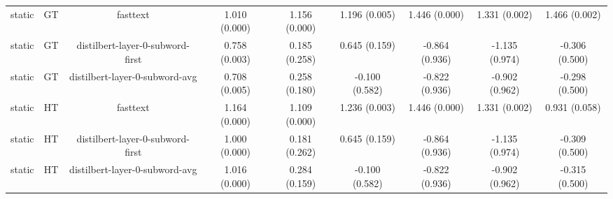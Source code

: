 \begin{sidewaystable}[htb]
\begin{tabular}{@{}ccccccccc@{}}
        static & GT & fasttext & 1.010 (0.000) & 1.156 (0.000) & 1.196 (0.005) & 1.446 (0.000) & 1.331 (0.002) & 1.466 (0.002) \\
        static & GT & distilbert-layer-0-subword-first & 0.758 (0.003) & 0.185 (0.258) & 0.645 (0.159) & -0.864 (0.936) & -1.135 (0.974) & -0.306 (0.500) \\
        static & GT & distilbert-layer-0-subword-avg & 0.708 (0.005) & 0.258 (0.180) & -0.100 (0.582) & -0.822 (0.936) & -0.902 (0.962) & -0.298 (0.500) \\
        static & HT & fasttext & 1.164 (0.000) & 1.109 (0.000) & 1.236 (0.003) & 1.446 (0.000) & 1.331 (0.002) & 0.931 (0.058) \\
        static & HT & distilbert-layer-0-subword-first & 1.000 (0.000) & 0.181 (0.262) & 0.645 (0.159) & -0.864 (0.936) & -1.135 (0.974) & -0.309 (0.500) \\
        static & HT & distilbert-layer-0-subword-avg & 1.016 (0.000) & 0.284 (0.159) & -0.100 (0.582) & -0.822 (0.936) & -0.902 (0.962) & -0.315 (0.500) \\
        \bottomrule
    \end{tabular}
\end{sidewaystable}